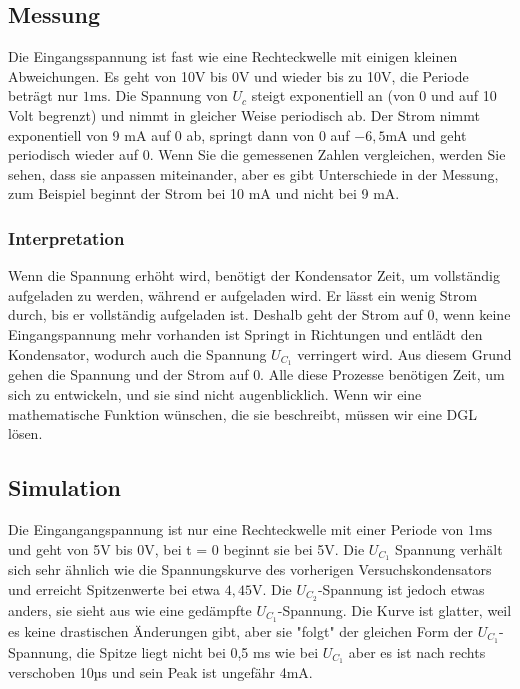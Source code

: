 %
%
\subsection{Messung}
 Die Eingangsspannung ist fast wie eine Rechteckwelle mit einigen kleinen Abweichungen. Es geht von 10V bis 0V und wieder bis zu 10V, die Periode beträgt nur $1\si{\milli\second}$. Die Spannung von $U_c$ steigt exponentiell an (von 0 und auf 10 Volt begrenzt) und nimmt in gleicher Weise periodisch ab. Der Strom nimmt exponentiell von 9 $\si{\milli\ampere}$ auf 0 ab, springt dann von 0 auf $-6,5 
\si{\milli\ampere} $ und geht periodisch wieder auf 0. Wenn Sie die gemessenen Zahlen vergleichen, werden Sie sehen, dass sie anpassen miteinander, aber es gibt Unterschiede in der Messung, zum Beispiel beginnt der Strom bei 10 $\si{\milli\ampere}$ und nicht bei 9 $\si{\milli\ampere}$.

\subsubsection{Interpretation}

Wenn die Spannung erhöht wird, benötigt der Kondensator Zeit, um vollständig aufgeladen zu werden, während er aufgeladen wird. Er lässt ein wenig Strom durch, bis er vollständig aufgeladen ist. Deshalb geht der Strom auf 0, wenn keine Eingangspannung mehr vorhanden ist Springt in Richtungen und entlädt den Kondensator, wodurch auch die Spannung $U_{C_1}$ verringert wird. Aus diesem Grund gehen die Spannung und der Strom auf 0. Alle diese Prozesse benötigen Zeit, um sich zu entwickeln, und sie sind nicht augenblicklich. Wenn wir eine mathematische Funktion wünschen, die sie beschreibt, müssen wir eine DGL lösen.

\subsection{Simulation} Die Eingangangspannung ist nur eine Rechteckwelle mit einer Periode von $1\si{\milli\second}$ und geht von 5V bis 0V, bei t = 0 beginnt sie bei 5V. Die $U_{C_1}$ Spannung verhält sich sehr ähnlich wie die Spannungskurve des vorherigen Versuchskondensators und erreicht Spitzenwerte bei etwa $4,45\si{\volt}$. Die $U_{C_2}$-Spannung ist jedoch etwas anders, sie sieht aus wie eine gedämpfte $U_{C_1}$-Spannung. Die Kurve ist glatter, weil es keine drastischen Änderungen gibt, aber sie "folgt" der gleichen Form der $U_{C_1}$-Spannung, die Spitze liegt nicht bei 0,5 ms wie bei $U_{C_1}$ aber es ist nach rechts verschoben 10µs und sein Peak ist ungefähr 4$\si{\milli\ampere}$.



